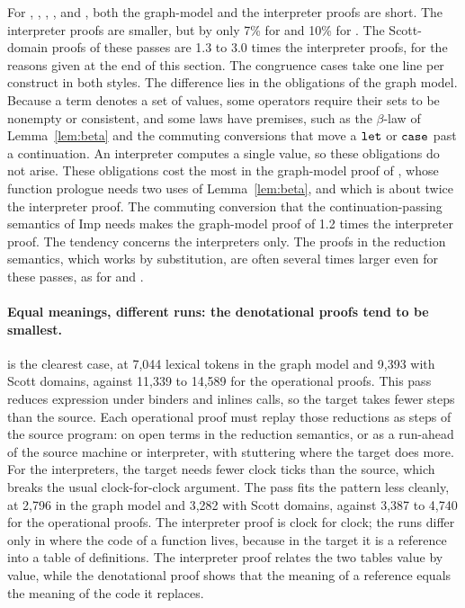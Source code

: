 For , , , , and
, both the graph-model and the interpreter
proofs are short. The interpreter proofs are smaller, but by only
7\% for  and 10\% for . The Scott-domain proofs of these passes are 1.3 to 3.0 times the
interpreter proofs, for the reasons given at the end of this
section. The congruence cases take one line per construct in both
styles. The difference lies in the obligations of the graph model.
Because a term denotes a set of values, some operators require their
sets to be nonempty or consistent, and some laws have premises, such as
the $\beta$-law of Lemma~\ref{lem:beta} and the commuting conversions
that move a $\mathtt{let}$ or $\mathtt{case}$ past a continuation. An
interpreter computes a single value, so these obligations do not arise.
These obligations cost the most in the graph-model proof of
, whose function prologue needs two uses of
Lemma~\ref{lem:beta}, and which is about twice the interpreter proof.
The commuting conversion that the continuation-passing semantics of
Imp needs makes the graph-model proof of  1.2 times
the interpreter proof. The tendency concerns the interpreters
only. The proofs in the reduction semantics, which works by
substitution, are often several times larger even for these passes, as for  and
.

\paragraph{Equal meanings, different runs: the denotational proofs tend to be smallest.}

 is the clearest case, at 7,044 lexical tokens in the graph model
and 9,393 with Scott domains, against 11,339 to 14,589 for the operational
proofs.  This pass reduces expression under binders and inlines calls,
so the target takes fewer steps than the source. Each operational
proof must replay those reductions as steps of the source program: on
open terms in the reduction semantics, or as a run-ahead of the source
machine or interpreter, with stuttering where the target does
more. For the interpreters, the target needs fewer clock ticks than
the source, which breaks the usual clock-for-clock argument. The
 pass fits the pattern less cleanly, at 2,796 in
the graph model and 3,282 with Scott domains, against 3,387 to 4,740 for the
operational proofs. The interpreter proof is clock for clock; the runs
differ only in where the code of a function lives, because in the
target it is a reference into a table of definitions. The interpreter
proof relates the two tables value by value, while the denotational
proof shows that the meaning of a reference equals the meaning of the
code it replaces.

